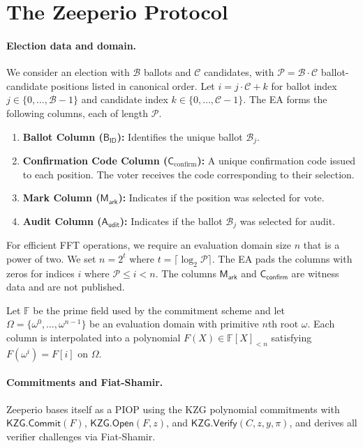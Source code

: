 \section{The Zeeperio Protocol}

\paragraph{Election data and domain.}
We consider an election with $\mathcal{B}$ ballots and $\mathcal{C}$ candidates, with $\mathcal{P}=\mathcal{B}\cdot \mathcal{C}$ ballot-candidate positions listed in canonical order. 
Let $i=j\cdot \mathcal{C}+k$ for ballot index $j\in\{0,\dots,\mathcal{B}-1\}$ and candidate index $k\in\{0,\dots,\mathcal{C}-1\}$. 
The EA forms the following columns, each of length $\mathcal{P}$.
\begin{enumerate}
    \item \textbf{Ballot Column ($\mathsf{B_{ID}}$):} Identifies the unique ballot $\mathcal{B}_j$.
    \item \textbf{Confirmation Code Column ($\mathsf{C}_\text{confirm}$):} A unique confirmation code issued to each position. The voter receives the code corresponding to their selection.
    \item \textbf{Mark Column ($\mathsf{M_{ark}}$):} Indicates if the position was selected for vote.
    \item \textbf{Audit Column ($\mathsf{A_{udit}}$):} Indicates if the ballot $\mathcal{B}_j$ was selected for audit.
\end{enumerate}

For efficient FFT operations, we require an evaluation domain size $n$ that is a power of two. 
We set $n = 2^t$ where $t = \lceil \log_2 \mathcal{P} \rceil$. 
The EA pads the columns with zeros for indices $i$ where $\mathcal{P} \le i < n$. 
The columns $\mathsf{M_{ark}}$ and $\mathsf{C}_{\mathsf{confirm}}$ are witness data and are not published. 

Let $\mathbb{F}$ be the prime field used by the commitment scheme and let $\Omega=\{\omega^0,\dots,\omega^{n-1}\}$
be an evaluation domain with primitive $n$th root $\omega$. Each column is interpolated into a polynomial
$F(X)\in \mathbb{F}[X]_{<n}$ satisfying $F(\omega^i)=F[i]$ on $\Omega$.

\paragraph{Commitments and Fiat-Shamir.}
Zeeperio bases itself as a PIOP using the KZG polynomial commitments with
$\mathsf{KZG.Commit}(F)$, $\mathsf{KZG.Open}(F,z)$, and $\mathsf{KZG.Verify}(C,z,y,\pi)$, and derives all verifier challenges via Fiat-Shamir.  

